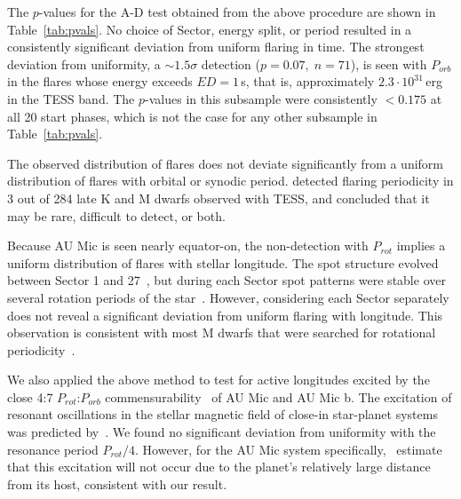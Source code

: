 \documentclass[fleqn,usenatbib]{mnras}%
\begin{document}
The $p$-values for the A-D test obtained from the above procedure are shown in Table~\ref{tab:pvals}. No choice of Sector, energy split, or period resulted in a consistently significant deviation from uniform flaring in time. The strongest deviation from uniformity, a $\sim1.5\sigma$ detection ($p=0.07,\;n=71$), is seen with $P_{orb}$ in the flares whose energy exceeds $ED=1$\,s, that is, approximately $2.3\cdot10^{31}\,$erg in the TESS band. The $p$-values in this subsample were consistently $<0.175$ at all 20 start phases, which is not the case for any other subsample in Table~\ref{tab:pvals}.

The observed distribution of flares does not deviate significantly from a uniform distribution of flares with orbital or synodic period. \citet{howard2021evryflare} detected flaring periodicity in 3 out of 284 late K and M dwarfs observed with TESS, and concluded that it may be rare, difficult to detect, or both.

Because AU Mic is seen nearly equator-on, the non-detection with $P_{rot}$ implies a uniform distribution of flares with stellar longitude. The spot structure evolved between Sector 1 and 27~\citep{martioli2021new}, but during each Sector spot patterns were stable over several rotation periods of the star~\citep{szabo2021changing}. However, considering each Sector separately does not reveal a significant deviation from uniform flaring with longitude. This observation is consistent with most M dwarfs that were searched for rotational periodicity~\citep{doyle2018, doyle2019}.

We also applied the above method to test for active longitudes excited by the close 4:7 $P_{rot}$:$P_{orb}$ commensurability~\citep{szabo2021changing,cale2021diving} of AU Mic and AU Mic b. The excitation of resonant oscillations in the stellar magnetic field of close-in star-planet systems was predicted by~\citet{lanza2022model}. We found no significant deviation from uniformity with the resonance period $P_{rot}/4$. However, for the AU Mic system specifically,~\citet{lanza2022model} estimate that this excitation will not occur due to the planet's relatively large distance from its host, consistent with our result.
 
\end{document}
